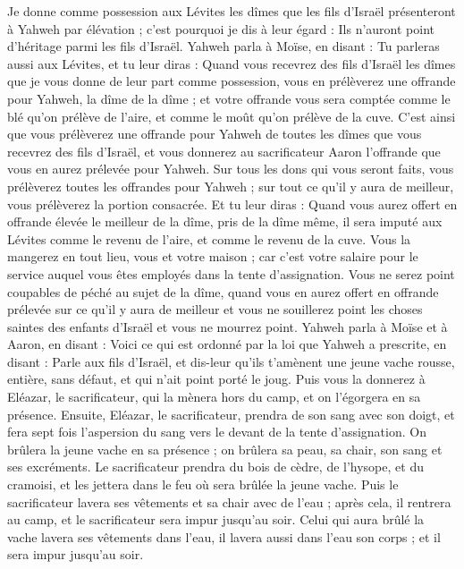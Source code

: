 \begin{multicols}{2}
Je donne comme possession aux Lévites les dîmes que les fils d'Israël présenteront à Yahweh par élévation ; c'est pourquoi je dis à leur égard : Ils n'auront point d'héritage parmi les fils d'Israël.
Yahweh parla à Moïse, en disant :
Tu parleras aussi aux Lévites, et tu leur diras : Quand vous recevrez des fils d'Israël les dîmes que je vous donne de leur part comme possession, vous en prélèverez une offrande pour Yahweh, la dîme de la dîme ;
et votre offrande vous sera comptée comme le blé qu’on prélève de l'aire, et comme le moût qu’on prélève de la cuve.
C’est ainsi que vous prélèverez une offrande pour Yahweh de toutes les dîmes que vous recevrez des fils d'Israël, et vous donnerez au sacrificateur Aaron l’offrande que vous en aurez prélevée pour Yahweh.
Sur tous les dons qui vous seront faits, vous prélèverez toutes les offrandes pour Yahweh ; sur tout ce qu'il y aura de meilleur, vous prélèverez la portion consacrée.
Et tu leur diras : Quand vous aurez offert en offrande élevée le meilleur de la dîme, pris de la dîme même, il sera imputé aux Lévites comme le revenu de l'aire, et comme le revenu de la cuve.
Vous la mangerez en tout lieu, vous et votre maison ; car c’est votre salaire pour le service auquel vous êtes employés dans la tente d’assignation.
Vous ne serez point coupables de péché au sujet de la dîme, quand vous en aurez offert en offrande prélevée sur ce qu’il y aura de meilleur et vous ne souillerez point les choses saintes des enfants d’Israël et vous ne mourrez point.
\VerseOne{}Yahweh parla à Moïse et à Aaron, en disant :
Voici ce qui est ordonné par la loi que Yahweh a prescrite, en disant : Parle aux fils d'Israël, et dis-leur qu'ils t'amènent une jeune vache rousse, entière, sans défaut, et qui n'ait point porté le joug.
Puis vous la donnerez à Eléazar, le sacrificateur, qui la mènera hors du camp, et on l'égorgera en sa présence.
Ensuite, Eléazar, le sacrificateur, prendra de son sang avec son doigt, et fera sept fois l’aspersion du sang vers le devant de la tente d'assignation.
On brûlera la jeune vache en sa présence ; on brûlera sa peau, sa chair, son sang et ses excréments.
Le sacrificateur prendra du bois de cèdre, de l'hysope, et du cramoisi, et les jettera dans le feu où sera brûlée la jeune vache.
Puis le sacrificateur lavera ses vêtements et sa chair avec de l'eau ; après cela, il rentrera au camp, et le sacrificateur sera impur jusqu'au soir.
Celui qui aura brûlé la vache lavera ses vêtements dans l'eau, il lavera aussi dans l'eau son corps ; et il sera impur jusqu'au soir.

\end{multicols}
